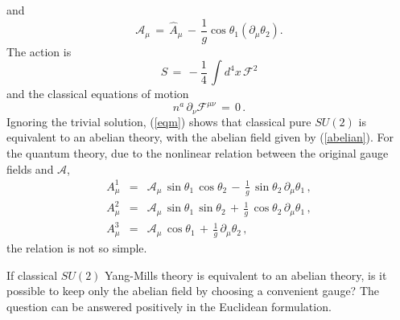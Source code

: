 \documentclass[a4paper,a4paper]{article}
\begin{document}
and
\begin{equation}
 \mathcal{A}_\mu \, = \, \hat{A}_\mu \, - \, \frac {1}{g} \cos \theta_1 
             \left( \partial_\mu \theta_2  \right).
 \label{abelian}
\end{equation}
The action is
\begin{equation}
  S \, = \, - \frac{1}{4} \, \int d^4x \, \mathcal{F}^2
\end{equation}
and the classical equations of motion
\begin{equation}
  n^a \, \partial_\nu \mathcal{F}^{\mu\nu} \, = \, 0 \, .
  \label{eqm}
\end{equation}
Ignoring the trivial solution, (\ref{eqm}) shows that classical pure 
$SU(2)$ is equivalent to an abelian theory, with the abelian field given 
by (\ref{abelian}). For the quantum theory, due to the nonlinear relation
between the original gauge fields and $\mathcal{A}$, 
\begin{eqnarray}
  A^1_\mu & = &
     \mathcal{A}_\mu \, \sin \theta_1 \, \cos \theta_2 \, - \,
            \frac{1}{g} \, \sin \theta_2 \, \partial_\mu \theta_1 \, , 
  \nonumber \\
  A^2_\mu & = &
      \mathcal{A}_\mu \, \sin \theta_1 \, \sin \theta_2 \, + \,
            \frac{1}{g} \, \cos \theta_2 \, \partial_\mu \theta_1 \, , 
  \nonumber \\
  A^3_\mu & = &
      \mathcal{A}_\mu \, \cos \theta_1 \, + \,
      \frac{1}{g}  \, \partial_\mu \theta_2  \, ,
  \label{geral}
\end{eqnarray}
the relation is not so simple.

If classical $SU(2)$ Yang-Mills theory is equivalent to an abelian theory, 
is it possible to keep only the abelian field by choosing a convenient
gauge?  The question can be answered positively in the Euclidean formulation.
\end{document}
